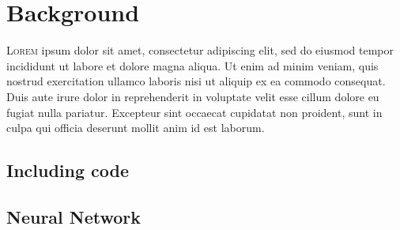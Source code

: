 

\chapter{Background}



\lettrine{L}{orem} ipsum dolor sit amet, consectetur adipiscing elit, sed do
eiusmod tempor incididunt ut labore et dolore magna aliqua. Ut enim ad minim
veniam, quis nostrud exercitation ullamco laboris nisi ut aliquip ex ea commodo
consequat. Duis aute irure dolor in reprehenderit in voluptate velit esse cillum
dolore eu fugiat nulla pariatur. Excepteur sint occaecat cupidatat non proident,
sunt in culpa qui officia deserunt mollit anim id est laborum.


\section{Including code}



\section{Neural Network}


